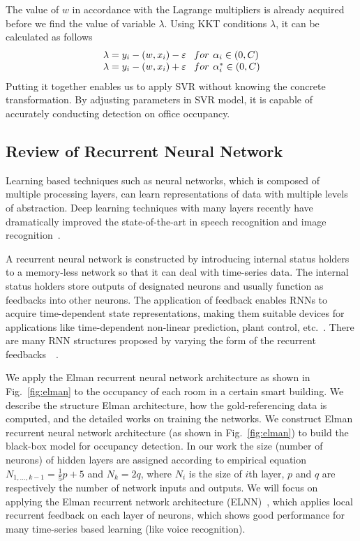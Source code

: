 The value of $w$ in accordance with the Lagrange multipliers is already acquired before we find the value of variable $\lambda$. Using KKT conditions $\lambda$, it can be calculated as follows
\[\begin{array}{l}
\lambda = {y_i} - \left( {w,{x_i}} \right) - \varepsilon {\kern 1pt} {\kern 1pt} {\kern 1pt} {\kern 1pt} {\kern 1pt} {\kern 1pt} {\kern 1pt} {\kern 1pt} for{\kern 1pt} {\kern 1pt} {\kern 1pt} {\kern 1pt} {\alpha _i} \in \left( {0,C} \right)\\
\lambda= {y_i} - \left( {w,{x_i}} \right) + \varepsilon {\kern 1pt} {\kern 1pt} {\kern 1pt} {\kern 1pt} {\kern 1pt} {\kern 1pt} {\kern 1pt} {\kern 1pt} for{\kern 1pt} {\kern 1pt} {\kern 1pt} {\kern 1pt} \alpha _i^* \in \left( {0,C} \right)
\end{array}\]
Putting it together enables us to apply SVR without knowing the concrete transformation. By adjusting parameters in SVR model, it is capable of accurately conducting detection on office occupancy.

\subsection{Review of Recurrent Neural Network }
Learning based techniques such as neural networks, which is composed of
multiple processing layers, can learn representations of data with
multiple levels of abstraction. Deep learning techniques with many layers recently
have dramatically improved the state-of-the-art
in speech recognition and image recognition~\cite{schmidhuber2014deep}.

A recurrent neural network is constructed by introducing
internal status holders to a memory-less network so that it can deal
with time-series data. The internal status holders store outputs of
designated neurons and usually function as feedbacks into other
neurons. The application of feedback enables RNNs to acquire
time-dependent state representations, making them suitable devices for
applications like time-dependent non-linear prediction, plant control,
etc.~\cite{haykin2004compreh}. There are many RNN structures
proposed by varying the form of the recurrent
feedbacks~~\cite{elman1990finding,haykin2004compreh,puskorius1996dynamic}.

We apply the Elman recurrent neural network architecture as shown in
Fig.~\ref{fig:elman} to the occupancy of each room in a certain smart building.
We describe the structure Elman architecture, how the gold-referencing data is
computed, and the detailed works on training the networks. We construct Elman recurrent neural network architecture (as shown in Fig.~\ref{fig:elman}) to build the black-box model for occupancy detection. In
our work the size (number of neurons) of hidden layers are assigned according
to empirical equation $N_{1,\ldots,k-1}=\frac15p+5$ and $N_k=2q$, where $N_i$
is the size of $i$th layer, $p$ and $q$ are respectively the number of network
inputs and outputs. We will focus on applying the Elman recurrent network
architecture (ELNN)~\cite{elman1990finding}, which applies local
recurrent feedback on each layer of neurons, which shows good
performance for many time-series based learning (like voice
recognition).


